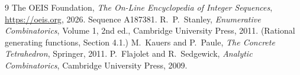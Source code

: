 \documentclass[11pt,a4paper]{article}
\theoremstyle{plain}
\theoremstyle{definition}
\begin{document}
\begin{thebibliography}{9}
 The OEIS Foundation, \emph{The On-Line Encyclopedia of Integer
Sequences}, \url{https://oeis.org}, 2026. Sequence A187381.
 R.~P.~Stanley, \emph{Enumerative Combinatorics}, Volume 1, 2nd ed.,
Cambridge University Press, 2011. (Rational generating functions, Section 4.1.)
 M.~Kauers and P.~Paule, \emph{The Concrete Tetrahedron}, Springer, 2011.
 P.~Flajolet and R.~Sedgewick, \emph{Analytic Combinatorics}, Cambridge
University Press, 2009.
\end{thebibliography}
\end{document}

